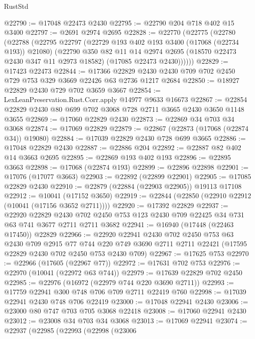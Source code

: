 \begin{lexlean}{RustStd}
\begin{coremodule}
@22790 := @17048 @22473 @2430
@22795 := @22790 @204 @718 @402 @15 @3400
@22797 := @2691 @2974 @2695
@22828 := @22770
    (@22775
      (@22780
        (@22788
          (@22795
            @22797
            (@22729 @193 @402 @193 @3400 (@17068 (@22734 @193)) @21080)
            (@22790
              @350
              @82
              @11
              @14
              @2974
              @2695
              (@18570 @22473 @2430 @347 @11 @2973 @18582)
              (@17085 @22473 @2430))))))
@22829 := @17423 @22473
@22844 := @17366
    @22829
    @2430
    @2430
    @709
    @702
    @2450
    @729
    @753
    @329
    @3669
    @22426
    @63
    @2736
    @1217
    @2684
@22850 := @18927 @22829 @2430 @729 @702 @3659 @3667
@22854 := LexLeanPreservation.Rust.Corr.apply @14977 @9633 @16673
@22867 := @22854 @22829 @2430 @80 @699 @702 @3068 @728 @2711 @3665 @2430 @3650 @1148 @3655
@22869 := @17060 @22829 @2430
@22873 := @22869 @34 @703 @34 @3068
@22874 := @17069 @22829
@22879 := @22867 (@22873 (@17068 (@22874 @34)) @19080)
@22884 := @17039 @22829 @2430 @728 @699 @3665
@22886 := @17048 @22829 @2430
@22887 := @22886 @204
@22892 := @22887 @82 @402 @14 @3663 @2695
@22895 := @22869 @193 @402 @193
@22896 := @22895 @3663
@22898 := @17068 (@22874 @193)
@22899 := @22896 @22898
@22901 := @17076 (@17077 @3663)
@22903 := @22892 (@22899 @22901)
@22905 := @17085 @22829 @2430
@22910 := @22879 (@22884 (@22903 @22905)) @19113 @17108
@22912 := @10041 (@17152 @3650)
@22919 := @22844 (@22850 (@22910 @22912 (@10041 (@17156 @3652 @2711))))
@22920 := @17392 @22829
@22937 := @22920
    @22829
    @2430
    @702
    @2450
    @753
    @123
    @2430
    @709
    @22425
    @34
    @731
    @63
    @741
    @3677
    @2711
    @2711
    @3682
@22941 := @16940 (@17448 (@22463 @17450)) @22829
@22966 := @22920
    @22941
    @2430
    @702
    @2450
    @753
    @63
    @2430
    @709
    @2915
    @77
    @744
    @220
    @749
    @3690
    @2711
    @2711
    @22421
    (@17595 @22829 @2430 @702 @2450 @753 @2430 @709)
@22967 := @17625 @753
@22970 := @22966 (@17605 (@22967 @77))
@22972 := @17631 @702 @753
@22976 := @22970 (@10041 (@22972 @63 @744))
@22979 := @17639 @22829 @702 @2450
@22985 := @22976 (@16972 (@22979 @744 @220 @3690 @2711))
@22993 := @17759 @22941 @300 @748 @706 @709 @2711 @22419 @760
@22998 := @17039 @22941 @2430 @748 @706 @22419
@23000 := @17048 @22941 @2430
@23006 := @23000 @80 @747 @703 @705 @3068 @22418
@23008 := @17060 @22941 @2430
@23012 := @23008 @34 @703 @34 @3068
@23013 := @17069 @22941
@23074 := @22937
    (@22985
      (@22993
        (@22998
          (@23006

\end{coremodule}
\end{lexlean}
